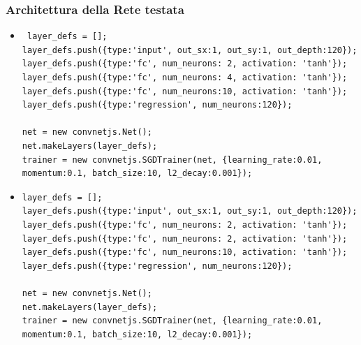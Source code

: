 \subsubsection{Architettura della Rete testata}
\label{Architettura della Rete testata 120}

\begin{itemize}
\item \begin{verbatim} layer_defs = [];
layer_defs.push({type:'input', out_sx:1, out_sy:1, out_depth:120});
layer_defs.push({type:'fc', num_neurons: 2, activation: 'tanh'});
layer_defs.push({type:'fc', num_neurons: 4, activation: 'tanh'});
layer_defs.push({type:'fc', num_neurons:10, activation: 'tanh'});
layer_defs.push({type:'regression', num_neurons:120});
        
net = new convnetjs.Net();
net.makeLayers(layer_defs);
trainer = new convnetjs.SGDTrainer(net, {learning_rate:0.01, 
momentum:0.1, batch_size:10, l2_decay:0.001});
\end{verbatim}

\item \begin{verbatim}
layer_defs = [];
layer_defs.push({type:'input', out_sx:1, out_sy:1, out_depth:120});
layer_defs.push({type:'fc', num_neurons: 2, activation: 'tanh'});
layer_defs.push({type:'fc', num_neurons: 2, activation: 'tanh'});
layer_defs.push({type:'fc', num_neurons:10, activation: 'tanh'});
layer_defs.push({type:'regression', num_neurons:120});
        
net = new convnetjs.Net();
net.makeLayers(layer_defs);
trainer = new convnetjs.SGDTrainer(net, {learning_rate:0.01, 
momentum:0.1, batch_size:10, l2_decay:0.001});
\end{verbatim}
\end{itemize}
\noindent
